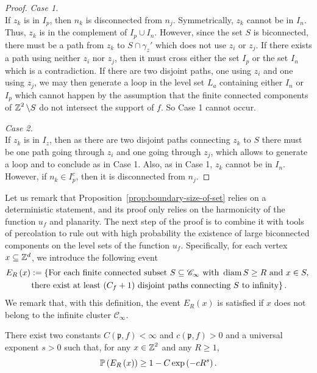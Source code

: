 \documentclass[12pt]{amsart}
\numberwithin{equation}{section}
\begin{document}
\begin{proof}
		{\it Case 1.} \\
		If $z_k$ is in $I_p$, then $n_k$ is disconnected from $n_j$. Symmetrically, $z_k$ cannot be in $I_n$. Thus, $z_k$ is in the complement of $I_p \cup I_n$.
		However, since the set $S$ is biconnected, there must be a path from $z_k$ to $S \cap \gamma_z'$ which does not use $z_i$ or $z_j$. If there exists a path using neither $z_i$ nor $z_j$, then it must cross either the set $I_p$ or the set $I_n$ which is a contradiction. If there are two disjoint paths, one using $z_i$ and one using $z_j$, we may then generate a loop in the level set $L_a$ containing either $I_n$ or $I_p$ which cannot happen by the assumption that the finite connected components of $\Z^2 \setminus S$ do not intersect the support of $f$. So Case 1 cannot occur. 
		\medskip
		
		{\it Case 2.} \\
		If $z_k$ is in $I_z$, then as there are two disjoint paths connecting $z_k$ to $S$ there must be one path going through $z_i$ and one going through $z_j$, which allows to generate a loop and to conclude as in Case 1. Also, as in Case 1, $z_k$ cannot be in $I_n$. 
		However, if $n_k \in I_p^c$, then it is disconnected from $n_j$. \end{proof}
	
	Let us remark that Proposition~\ref{prop:boundary-size-of-set} relies on a deterministic statement, and its proof only relies on the harmonicity of the function $u_f$ and planarity. The next step of the proof is to combine it with tools of percolation to rule out with high probability the existence of large biconnected components on the level sets of the function $u_f$. Specifically, for each vertex $x \subseteq \Zd$, we introduce the following event
	\begin{multline} \label{eq:def.eventE}
		E_R \left( x \right) := \left\{ \mbox{For each finite connected subset } S \subseteq \mathscr{C}_\infty \mbox{ with } \diam S \geq R \mbox{ and } x \in S , \right. \\
		\left. \mbox{there exist at least } (C_f + 1) \mbox{ disjoint paths connecting } S \mbox{ to infinity} \right\}.
	\end{multline}
	We remark that, with this definition, the event $ E_R \left( x \right)$ is satisfied if $x$ does not belong to the infinite cluster $\mathscr{C}_\infty$.
	
	\begin{prop} \label{prop:disjoint-paths-to-infinty-exponential}
		There exist two constants $C(\mathfrak{p},f) < \infty$ and $c(\mathfrak{p},f) > 0$ and a universal exponent $s > 0$ such that, for any $x \in \Z^2$ and any $R \geq 1$,
		\begin{equation} \label{eq:prop:disjoint-paths-to-infinty-exponential}
			\P \left(  E_R \left( x \right) \right) \geq 1 - C \exp \left( - c R^{s} \right).
		\end{equation}
	\end{prop}
	
\end{document}
